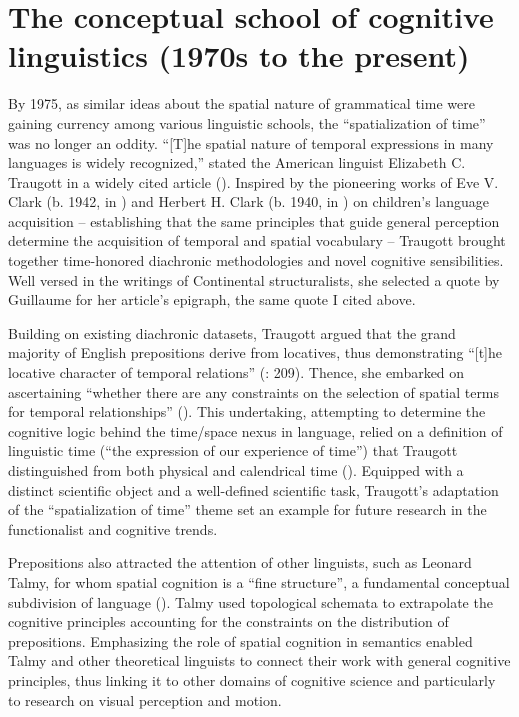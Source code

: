\documentclass[output=paper]{langsci/langscibook}
\begin{document}
\section{The conceptual school of cognitive linguistics (1970s to the present)}

By 1975, as similar ideas about the spatial nature of grammatical time were gaining currency among various linguistic schools, the “spatialization of time” was no longer an oddity. “[T]he spatial nature of temporal expressions in many languages is widely recognized,” stated the American linguist Elizabeth C. Traugott in a widely cited article (\citeyear[207]{traugott_spatial_1975}). Inspired by the pioneering works of Eve V. Clark (b. 1942, in \citeyear{clark_acquisition_1971}) and Herbert H. Clark (b. 1940, in \citeyear{moore_space_1973}) on children’s language acquisition -- establishing that the same principles that guide general perception determine the acquisition of temporal and spatial vocabulary -- Traugott brought together time-honored diachronic methodologies and novel cognitive sensibilities. Well versed in the writings of Continental structuralists, she selected a quote by Guillaume for her article’s epigraph, the same quote I cited above.

Building on existing diachronic datasets, Traugott argued that the grand majority of English prepositions derive from locatives, thus demonstrating “[t]he locative character of temporal relations” (\citeyear[209]{traugott_spatial_1975}: 209). Thence, she embarked on ascertaining “whether there are any constraints on the selection of spatial terms for temporal relationships” (\citeyear[207]{traugott_spatial_1975}). This undertaking, attempting to determine the cognitive logic behind the time/space nexus in language, relied on a definition of linguistic time (“the expression of our experience of time”) that Traugott distinguished from both physical and calendrical time (\citeyear[207]{traugott_spatial_1975}). Equipped with a distinct scientific object and a well-defined scientific task, Traugott’s adaptation of the “spatialization of time” theme set an example for future research in the functionalist and cognitive trends. 

Prepositions also attracted the attention of other linguists, such as Leonard Talmy, for whom spatial cognition is a “fine structure”, a fundamental conceptual subdivision of language (\citeyear[225]{pick_how_1983}). Talmy used topological schemata to extrapolate the cognitive principles accounting for the constraints on the distribution of prepositions. Emphasizing the role of spatial cognition in semantics enabled Talmy and other theoretical linguists to connect their work with general cognitive principles, thus linking it to other domains of cognitive science and particularly to research on visual perception and motion. 
\end{document}
